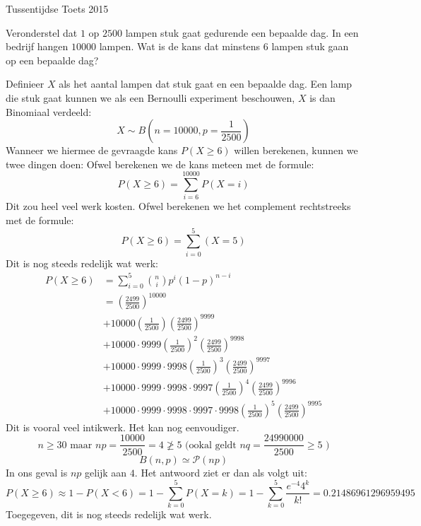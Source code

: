 \documentclass[main.tex]{subfiles}
\begin{document}
\begin{examenvraag}{Tussentijdse Toets 2015}
  \begin{ex-vraag}
  Veronderstel dat $1$ op $2500$ lampen stuk gaat gedurende een bepaalde dag.
  In een bedrijf hangen $10000$ lampen.
  Wat is de kans dat minstens $6$ lampen stuk gaan op een bepaalde dag?
  \end{ex-vraag}

  \begin{ex-antwoord}
    Definieer $X$ als het aantal lampen dat stuk gaat en een bepaalde dag.
    Een lamp die stuk gaat kunnen we als een Bernoulli experiment beschouwen, $X$ is dan Binomiaal verdeeld:
    \[ X \sim B\left(n=10000,p=\frac{1}{2500}\right)\]
    Wanneer we hiermee de gevraagde kans $P(X \ge 6)$ willen berekenen, kunnen we twee dingen doen:
    Ofwel berekenen we de kans meteen met de formule: 
    \[ P(X \ge 6) = \sum_{i=6}^{10000}P(X=i) \]
    Dit zou heel veel werk kosten.
    Ofwel berekenen we het complement rechtstreeks met de formule:
    \[ P(X \ge 6) = \sum_{i=0}^{5}(X=5) \]
    Dit is nog steeds redelijk wat werk:
    \begin{align*}
      P(X \ge 6)
      &= \sum_{i=0}^{5}\binom{n}{i}p^{i}(1-p)^{n-i}\\
      &= \left(\frac{2499}{2500}\right)^{10000}\\
      &+ 10000\left(\frac{1}{2500}\right)\left(\frac{2499}{2500}\right)^{9999}\\
      &+ 10000\cdot 9999\left(\frac{1}{2500}\right)^{2}\left(\frac{2499}{2500}\right)^{9998}\\
      &+ 10000\cdot 9999 \cdot 9998\left(\frac{1}{2500}\right)^{3}\left(\frac{2499}{2500}\right)^{9997}\\
      &+ 10000\cdot 9999 \cdot 9998 \cdot 9997\left(\frac{1}{2500}\right)^{4}\left(\frac{2499}{2500}\right)^{9996}\\
      &+ 10000\cdot 9999 \cdot 9998 \cdot 9997 \cdot 9998\left(\frac{1}{2500}\right)^{5}\left(\frac{2499}{2500}\right)^{9995}
    \end{align*}
    Dit is vooral veel intikwerk.
    Het kan nog eenvoudiger.
    \[ n \ge 30 \text{ maar } np = \frac{10000}{2500} = 4 \not\ge 5 \text{ (ookal geldt } nq = \frac{24990000}{2500} \ge 5 \text{ )}  \]
    \[ B(n,p) \simeq\mathcal{P}(np) \]
    In ons geval is $np$ gelijk aan $4$.
    Het antwoord ziet er dan als volgt uit:
    \[ P(X \ge 6) \approx 1-P(X<6) = 1-\sum_{k=0}^{5}P(X=k) = 1-\sum_{k=0}^{5}\frac{e^{-4}4^{k}}{k!} = 0.21486961296959495 \]
    Toegegeven, dit is nog steeds redelijk wat werk.
  \end{ex-antwoord}
\end{examenvraag}
\end{document}
